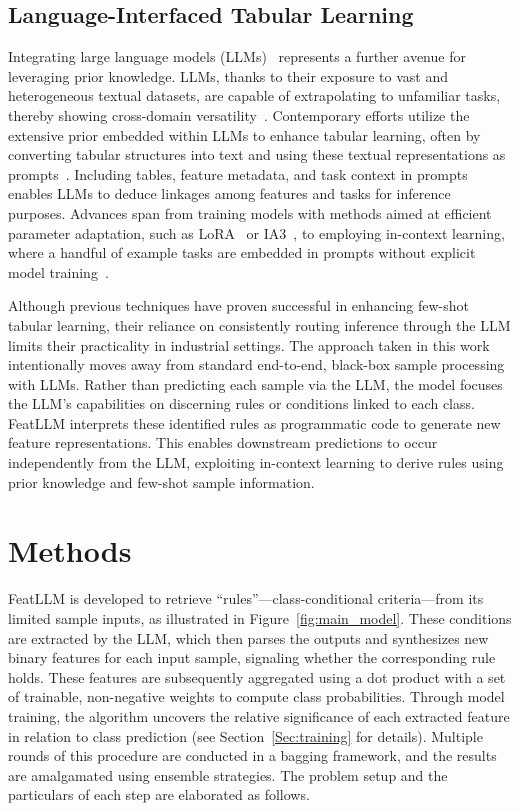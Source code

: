 \subsection{Language-Interfaced Tabular Learning} Integrating large language models (LLMs)~\cite{anil2023palm,openai2023gpt4} represents a further avenue for leveraging prior knowledge. LLMs, thanks to their exposure to vast and heterogeneous textual datasets, are capable of extrapolating to unfamiliar tasks, thereby showing cross-domain versatility~\cite{brown2020language}. Contemporary efforts utilize the extensive prior embedded within LLMs to enhance tabular learning, often by converting tabular structures into text and using these textual representations as prompts~\cite{dinh2022lift,hegselmann2023tabllm,wang2023anypredict}. Including tables, feature metadata, and task context in prompts enables LLMs to deduce linkages among features and tasks for inference purposes. Advances span from training models with methods aimed at efficient parameter adaptation, such as LoRA~\cite{hu2021lora} or IA3~\cite{liu2022few}, to employing in-context learning, where a handful of example tasks are embedded in prompts without explicit model training~\cite{dinh2022lift,hegselmann2023tabllm,nam2023semi,slack2023tablet}.

Although previous techniques have proven successful in enhancing few-shot tabular learning, their reliance on consistently routing inference through the LLM limits their practicality in industrial settings. The approach taken in this work intentionally moves away from standard end-to-end, black-box sample processing with LLMs. Rather than predicting each sample via the LLM, the model focuses the LLM’s capabilities on discerning rules or conditions linked to each class. \textsf{FeatLLM} interprets these identified rules as programmatic code to generate new feature representations. This enables downstream predictions to occur independently from the LLM, exploiting in-context learning to derive rules using prior knowledge and few-shot sample information.

\section{Methods}
\textsf{FeatLLM} is developed to retrieve “rules”—class-conditional criteria—from its limited sample inputs, as illustrated in Figure~\ref{fig:main_model}. These conditions are extracted by the LLM, which then parses the outputs and synthesizes new binary features for each input sample, signaling whether the corresponding rule holds. These features are subsequently aggregated using a dot product with a set of trainable, non-negative weights to compute class probabilities. Through model training, the algorithm uncovers the relative significance of each extracted feature in relation to class prediction (see Section~\ref{Sec:training} for details). Multiple rounds of this procedure are conducted in a bagging framework, and the results are amalgamated using ensemble strategies. The problem setup and the particulars of each step are elaborated as follows.

